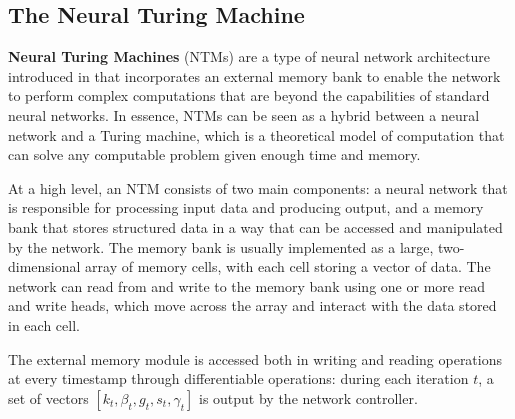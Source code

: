 \documentclass{article}
\begin{document}
\subsection{The Neural Turing Machine}

\textbf{Neural Turing Machines} (NTMs) are a type of neural network architecture introduced in \cite{GRA14} that incorporates an external memory bank to enable the network to perform complex computations that are beyond the capabilities of standard neural networks. In essence, NTMs can be seen as a hybrid between a neural network and a Turing machine, which is a theoretical model of computation that can solve any computable problem given enough time and memory.

At a high level, an NTM consists of two main components: a neural network that is responsible for processing input data and producing output, and a memory bank that stores structured data in a way that can be accessed and manipulated by the network. The memory bank is usually implemented as a large, two-dimensional array of memory cells, with each cell storing a vector of data. The network can read from and write to the memory bank using one or more read and write heads, which move across the array and interact with the data stored in each cell.

The external memory module is accessed both in writing and reading operations at every timestamp through differentiable operations: during each iteration $t$, a set of vectors $[k_t, \beta_t, g_t, s_t, \gamma_t]$ is output by the network controller.
\end{document}
